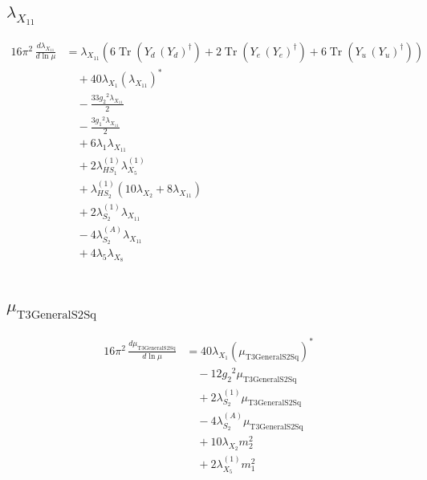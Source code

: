 \documentclass[10pt,a4paper]{article}
\begin{document}
\subsection*{$\lambda_{X_{11}}$}
\begin{align*}
16\pi^2\,\frac{d \lambda_{X_{11}}}{d\ln\mu} &={\lambda_{X_{11}}} (6 \operatorname{Tr}\!\left({Y_d}\,\left({Y_d}\right)^{\dagger}\right)+2 \operatorname{Tr}\!\left({Y_e}\,\left({Y_e}\right)^{\dagger}\right)+6 \operatorname{Tr}\!\left({Y_u}\,\left({Y_u}\right)^{\dagger}\right)) \\
&\quad +40 {\lambda_{X_{1}}} \left({\lambda_{X_{11}}}\right)^{*} \\
&\quad -\frac{33 {g_2}^2 {\lambda_{X_{11}}}}{2} \\
&\quad -\frac{3 {g_1}^2 {\lambda_{X_{11}}}}{2} \\
&\quad +6 {\lambda_1} {\lambda_{X_{11}}} \\
&\quad +2 {\lambda_{HS_1}^{(1)}} {\lambda_{X_{5}}^{(1)}} \\
&\quad +{\lambda_{HS_2}^{(1)}} (10 {\lambda_{X_{2}}}+8 {\lambda_{X_{11}}}) \\
&\quad +2 {\lambda_{S_2}^{(1)}} {\lambda_{X_{11}}} \\
&\quad -4 {\lambda_{S_2}^{(A)}} {\lambda_{X_{11}}} \\
&\quad +4 {\lambda_5} {\lambda_{X_{8}}} \\
\end{align*}
\subsection*{$\mu_{\mathrm{T3GeneralS2Sq}}$}
\begin{align*}
16\pi^2\,\frac{d \mu_{\mathrm{T3GeneralS2Sq}}}{d\ln\mu} &=40 {\lambda_{X_{1}}} \left({\mu_{\mathrm{T3GeneralS2Sq}}}\right)^{*} \\
&\quad -12 {g_2}^2 {\mu_{\mathrm{T3GeneralS2Sq}}} \\
&\quad +2 {\lambda_{S_2}^{(1)}} {\mu_{\mathrm{T3GeneralS2Sq}}} \\
&\quad -4 {\lambda_{S_2}^{(A)}} {\mu_{\mathrm{T3GeneralS2Sq}}} \\
&\quad +10 {\lambda_{X_{2}}} {m_2^2} \\
&\quad +2 {\lambda_{X_{5}}^{(1)}} {m_1^2} \\
\end{align*}
\end{document}
